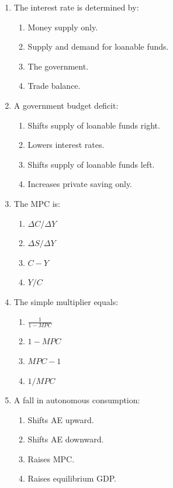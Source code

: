 \documentclass[12pt]{article}
\begin{document}
\begin{enumerate}[label=\textbf{\arabic*.}]
\item The interest rate is determined by:
\begin{enumerate}[label=(\Alph*)]
    \item Money supply only.
    \item Supply and demand for loanable funds.
    \item The government.
    \item Trade balance.
\end{enumerate}

\item A government budget deficit:
\begin{enumerate}[label=(\Alph*)]
    \item Shifts supply of loanable funds right.
    \item Lowers interest rates.
    \item Shifts supply of loanable funds left.
    \item Increases private saving only.
\end{enumerate}

\item The MPC is:
\begin{enumerate}[label=(\Alph*)]
    \item $\Delta C / \Delta Y$
    \item $\Delta S / \Delta Y$
    \item $C - Y$
    \item $Y / C$
\end{enumerate}
\newpage
\item The simple multiplier equals:
\begin{enumerate}[label=(\Alph*)]
    \item $\frac{1}{1 - MPC}$
    \item $1 - MPC$
    \item $MPC - 1$
    \item $1 / MPC$
\end{enumerate}

\item A fall in autonomous consumption:
\begin{enumerate}[label=(\Alph*)]
    \item Shifts AE upward.
    \item Shifts AE downward.
    \item Raises MPC.
    \item Raises equilibrium GDP.
\end{enumerate}


\end{enumerate}
\end{document}
